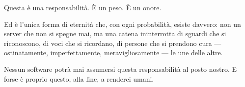 Questa è una responsabilità. È un peso. È un onore.

Ed è l'unica forma di eternità che, con ogni probabilità, esiste davvero: non un server che non si spegne mai, ma una catena ininterrotta di sguardi che si riconoscono, di voci che si ricordano, di persone che si prendono cura --- ostinatamente, imperfettamente, meravigliosamente --- le une delle altre.

Nessun software potrà mai assumersi questa responsabilità al posto nostro. E forse è proprio questo, alla fine, a renderci umani.